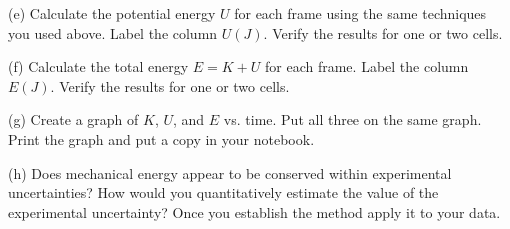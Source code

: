 (e) Calculate the potential energy $U$ for each frame using the same techniques you used above.
Label the column $U(J)$.
Verify the results for one or two cells.

(f) Calculate the total energy $E = K + U$ for each frame.
Label the column $E(J)$.
Verify the results for one or two cells.

(g) Create a graph of $K$, $U$, and $E$ vs. time.
 Put all three on the same graph.
 Print the graph and put a copy in your notebook.

(h) Does mechanical energy appear
 to be conserved within experimental uncertainties? How would you quantitatively estimate
 the value of the experimental uncertainty? Once you establish the method apply it to your data.

\vspace{2.5cm}

